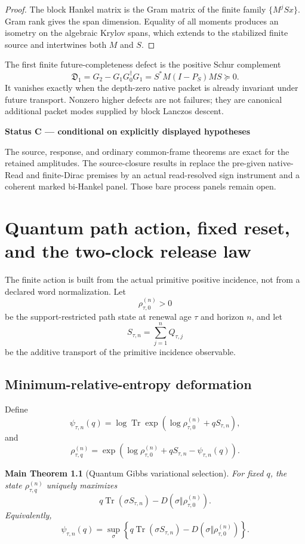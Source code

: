 \documentclass[11pt,oneside,openany]{book}
\numberwithin{equation}{chapter}
\newtheorem{maintheorem}[theorem]{Main Theorem}
\theoremstyle{definition}
\theoremstyle{remark}
\newcommand{\Tr}{\operatorname{Tr}}
\newenvironment{statusbox}[2]{%
  \par\medskip\noindent
  \begin{center}\begin{minipage}{0.94\textwidth}
  \colorbox{#1!8}{\parbox{\dimexpr\linewidth-2\fboxsep\relax}{\textbf{#2}}}\par\smallskip
}{%
  \end{minipage}\end{center}\medskip
}
\newcommand{\Conditional}[1]{\begin{statusbox}{CondColor}{Status C --- conditional on explicitly displayed hypotheses}#1\end{statusbox}}
\begin{document}
\begin{proof}
The block Hankel matrix is the Gram matrix of the finite family
\(\{M^jSx\}\).  Gram rank gives the span dimension.  Equality of all moments
produces an isometry on the algebraic Krylov spans, which extends to the
stabilized finite source and intertwines both \(M\) and \(S\).
\end{proof}

The first finite future-completeness defect is the positive Schur complement
\[
 \boxed{
 \mathfrak D_1
 =G_2-G_1G_0^\dagger G_1
 =S^*M(I-P_S)MS\succeq0.}
\]
It vanishes exactly when the depth-zero native packet is already invariant
under future transport.  Nonzero higher defects are not failures; they are
canonical additional packet modes supplied by block Lanczos descent.

\Conditional{The source, response, and ordinary common-frame theorems are
exact for the retained amplitudes.  The source-closure results in
\Cref{ch:v6-process,ch:v6-marked-dirac} replace the pre-given native-Read and
finite-Dirac premises by an actual read-resolved sign instrument and a coherent
marked bi-Hankel panel.  Those bare process panels remain open.}


\chapter{Quantum path action, fixed reset, and the two-clock release law}
\label{ch:bkm-action}

The finite action is built from the actual primitive positive incidence, not
from a declared word normalization.  Let
\[
 \rho_{\tau,0}^{(n)}>0
\]
be the support-restricted path state at renewal age \(\tau\) and horizon
\(n\), and let
\[
 S_{\tau,n}
 =
 \sum_{j=1}^nQ_{\tau,j}
\]
be the additive transport of the primitive incidence observable.

\section{Minimum-relative-entropy deformation}

Define
\[
 \psi_{\tau,n}(q)
 =
 \log\Tr
 \exp\!\left(
 \log\rho_{\tau,0}^{(n)}
 +
 qS_{\tau,n}
 \right),
\]
and
\[
 \boxed{
 \rho_{\tau,q}^{(n)}
 =
 \exp\!\left(
 \log\rho_{\tau,0}^{(n)}
 +
 qS_{\tau,n}
 -
 \psi_{\tau,n}(q)
 \right).}
\]

\begin{maintheorem}[Quantum Gibbs variational selection]
\label{thm:path-Gibbs}
For fixed \(q\), the state \(\rho_{\tau,q}^{(n)}\) uniquely maximizes
\[
 q\Tr(\sigma S_{\tau,n})
 -
 D(\sigma\Vert\rho_{\tau,0}^{(n)}).
\]
Equivalently,
\[
 \psi_{\tau,n}(q)
 =
 \sup_\sigma
 \left\{
 q\Tr(\sigma S_{\tau,n})
 -
 D(\sigma\Vert\rho_{\tau,0}^{(n)})
 \right\}.
\]
\end{maintheorem}
\end{document}
